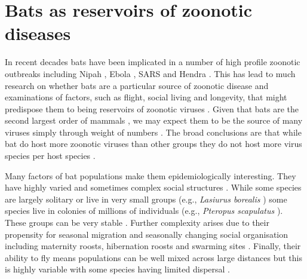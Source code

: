 
\section{Bats as reservoirs of zoonotic diseases}


In recent decades bats have been implicated in a number of high profile zoonotic outbreaks including Nipah \cite{field2001natural, halpin2011pteropid}, Ebola \cite{leroy2005fruit}, SARS \cite{li2005bats} and Hendra \cite{field2001natural}.
This has lead to much research on whether bats are a particular source of zoonotic disease \cite{luis2013comparison, olival2015bats, wang2011mass} and examinations of factors, such as flight, social living and longevity, that might predispose them to being reservoirs of zoonotic viruses \cite{calisher2006bats, o2014bat, dobson2005links, racey2015uniqueness, kuzmin2011bats}.
Given that bats are the second largest order of mammals \cite{wilson2005mammal}, we may expect them to be the source of many viruses simply through weight of numbers \cite{luis2013comparison}.
The broad conclusions are that while bat do host more zoonotic viruses than other groups \cite{luis2013comparison} they do not host more virus species per host species \cite{olival2015bats}.

Many factors of bat populations make them epidemiologically interesting.
They have highly varied and sometimes complex social structures \cite{kerth2008causes}.
While some species are largely solitary or live in very small groups (e.g., \emph{Lasiurus borealis} \cite{shump1982lasiurus}) some species live in colonies of millions of individuals (e.g., \emph{Pteropus scapulatus} \cite{birt2008little}).
These groups can be very stable \cite{kerth2011bats, mccracken1981social}.
Further complexity arises due to their propensity for seasonal migration \cite{fleming2003ecology, richter2008first, cryan2014continental} and seasonally changing social organisation including maternity roosts, hibernation roosts and swarming sites \cite{kerth2008causes}.
Finally, their ability to fly means populations can be well mixed across large distances \cite{peel2013continent, petit1999male} but this is highly variable with some species having limited dispersal \cite{wilmer1994extreme}.

